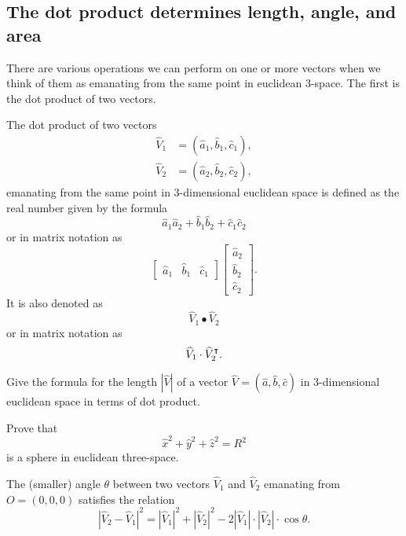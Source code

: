 \documentclass{ximera}
\begin{document}
\subsection*{The dot product determines length, angle, and area}

There are various operations we can perform on one or more vectors when we
think of them as emanating from the same point in euclidean $3$-space. The
first is the dot product of two vectors.

\begin{definition}
The dot product of two vectors%
\begin{align*}
\hat{V}_{1}  &  =\left(  \hat{a}_{1},\hat{b}_{1},\hat{c}_{1}\right), \\
\hat{V}_{2}  &  =\left(  \hat{a}_{2},\hat{b}_{2},\hat{c}_{2}\right),
\end{align*}
emanating from the same point in 3-dimensional euclidean space is
defined as the real number given by the formula%
\[
\hat{a}_{1}\hat{a}_{2}+\hat{b}_{1}\hat{b}_{2}+\hat{c}_{1}\hat{c}_{2}%
\]
or in matrix notation as%
\[
\begin{bmatrix}
\hat{a}_{1} & \hat{b}_{1} & \hat{c}_{1}%
\end{bmatrix}
\begin{bmatrix}
\hat{a}_{2}\\
\hat{b}_{2}\\
\hat{c}_{2}%
\end{bmatrix}.
\]
It is also denoted as%
\[
\hat{V}_{1}\bullet\hat{V}_{2}%
\]
or in matrix notation as%
\[
\widehat{V}_{1}\cdot \widehat{V}_{2}^\intercal.
\]

\end{definition}

\begin{problem}
Give the formula for the length $\left\vert \hat{V}\right\vert $ of a vector
$\hat{V}=\left(  \hat{a},\hat{b},\hat{c}\right)  $ in 3-dimensional euclidean
space in terms of dot product.
\end{problem}

\begin{problem}
  Prove that
  \[
  \hat{x}^2 + \hat{y}^2 + \hat{z}^2 = R^2
  \]
  is a sphere in euclidean three-space.
\end{problem}


\begin{lemma}
\label{110} The (smaller) angle $\theta$ between two
vectors $\hat{V}_{1}$ and $\hat{V}_{2}$ emanating from $O=\left(
0,0,0\right)  $ satisfies the relation%
\[
\left\vert \hat{V}_{2}-\hat{V}_{1}\right\vert ^{2}=\left\vert \hat{V}%
_{1}\right\vert ^{2}+\left\vert \hat{V}_{2}\right\vert ^{2}-2\left\vert
\hat{V}_{1}\right\vert \cdot\left\vert \hat{V}_{2}\right\vert \cdot
\cos\theta.
\]
\end{lemma}
\end{document}
